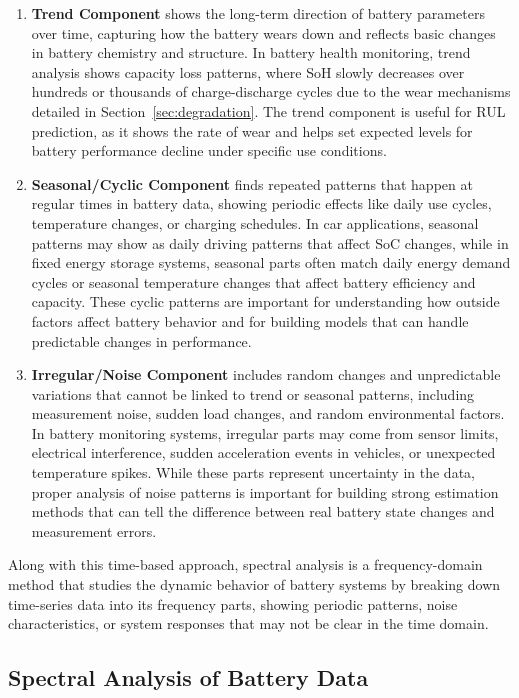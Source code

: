 \begin{enumerate}
    \item \textbf{Trend Component} shows the long-term direction of battery parameters over time, capturing how the battery wears down and reflects basic changes in battery chemistry and structure. In battery health monitoring, trend analysis shows capacity loss patterns, where SoH slowly decreases over hundreds or thousands of charge-discharge cycles due to the wear mechanisms detailed in Section~\ref{sec:degradation}. The trend component is useful for RUL prediction, as it shows the rate of wear and helps set expected levels for battery performance decline under specific use conditions.
   \item  \textbf{Seasonal/Cyclic Component} finds repeated patterns that happen at regular times in battery data, showing periodic effects like daily use cycles, temperature changes, or charging schedules. In car applications, seasonal patterns may show as daily driving patterns that affect SoC changes, while in fixed energy storage systems, seasonal parts often match daily energy demand cycles or seasonal temperature changes that affect battery efficiency and capacity. These cyclic patterns are important for understanding how outside factors affect battery behavior and for building models that can handle predictable changes in performance.
   \item \textbf{Irregular/Noise Component} includes random changes and unpredictable variations that cannot be linked to trend or seasonal patterns, including measurement noise, sudden load changes, and random environmental factors. In battery monitoring systems, irregular parts may come from sensor limits, electrical interference, sudden acceleration events in vehicles, or unexpected temperature spikes. While these parts represent uncertainty in the data, proper analysis of noise patterns is important for building strong estimation methods that can tell the difference between real battery state changes and measurement errors.
\end{enumerate}



Along with this time-based approach, spectral analysis is a frequency-domain method that studies the dynamic behavior of battery systems by breaking down time-series data into its frequency parts, showing periodic patterns, noise characteristics, or system responses that may not be clear in the time domain. 

\subsection{Spectral Analysis of Battery Data}

